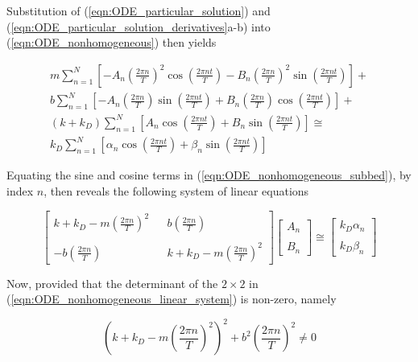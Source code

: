 \noindent Substitution of (\ref{eqn:ODE_particular_solution}) and (\ref{eqn:ODE_particular_solution_derivatives}a-b) into (\ref{eqn:ODE_nonhomogeneous}) then yields

\begin{multline}
	m\sum_{n=1}^{N} \left[-A_n\left(\frac{2\pi n}{T}\right)^2\cos\left(\frac{2\pi nt}{T}\right) - B_n\left(\frac{2\pi n}{T}\right)^2\sin\left(\frac{2\pi nt}{T}\right)\right] +\\
	b\sum_{n=1}^{N} \left[-A_n\left(\frac{2\pi n}{T}\right)\sin\left(\frac{2\pi nt}{T}\right) + B_n\left(\frac{2\pi n}{T}\right)\cos\left(\frac{2\pi nt}{T}\right)\right] +\\
	(k + k_D)\sum_{n=1}^{N} \left[A_n\cos\left(\frac{2\pi nt}{T}\right) + B_n\sin\left(\frac{2\pi nt}{T}\right)\right] \cong\\
	k_D\sum_{n=1}^{N} \left[\alpha_n\cos\left(\frac{2\pi nt}{T}\right) + \beta_n\sin\left(\frac{2\pi nt}{T}\right)\right]
	\label{eqn:ODE_nonhomogeneous_subbed}
\end{multline}

\noindent Equating the sine and cosine terms in (\ref{eqn:ODE_nonhomogeneous_subbed}), by index $n$, then reveals the following system of linear equations

\begin{equation}
	\begin{bmatrix}
		k + k_D - m\left(\frac{2\pi n}{T}\right)^2 & {} & b\left(\frac{2\pi n}{T}\right) \\
		{} & {} & {}\\
		-b\left(\frac{2\pi n}{T}\right) & {} & k + k_D - m\left(\frac{2\pi n}{T}\right)^2
	\end{bmatrix}
	\begin{bmatrix}
		A_n \\
		{} \\
		B_n
	\end{bmatrix} \cong
	\begin{bmatrix}
		k_D\alpha_n \\
		{} \\
		k_D\beta_n
	\end{bmatrix}
	\label{eqn:ODE_nonhomogeneous_linear_system}
\end{equation}

\noindent Now, provided that the determinant of the $2\times 2$ in (\ref{eqn:ODE_nonhomogeneous_linear_system}) is non-zero, namely

\begin{equation}
	\left(k + k_D - m\left(\frac{2\pi n}{T}\right)^2\right)^2 + b^2\left(\frac{2\pi n}{T}\right)^2 \neq 0
	\label{eqn:ODE_nonhomogeneous_nonzero_det}
\end{equation}

